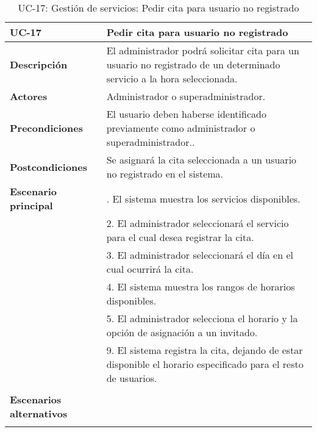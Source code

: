 \begin{table}[H]
  \begin{center}
    \begin{tabularx}{16.4cm}{|l|X|}
      \hline
      \textbf{UC-17} & \textbf{Pedir cita para usuario no registrado}\\
      \hline
      \textbf{Descripción} & El administrador podrá solicitar cita para un usuario no registrado de un determinado servicio a la hora seleccionada.\\
      \hline
      \textbf{Actores} & Administrador o superadministrador.\\
      \hline
      \textbf{Precondiciones} & El usuario deben haberse identificado previamente como administrador o superadministrador..\\
      \hline
      \textbf{Postcondiciones} & Se asignará la cita seleccionada a un usuario no registrado en el sistema.\\
      \hline
      \textbf{Escenario principal} & \smallskip 1. El sistema muestra los servicios disponibles.\\
      & 2. El administrador seleccionará el servicio para el cual desea registrar la cita.\\
      & 3. El administrador seleccionará el día en el cual ocurrirá la cita.\\
      & 4. El sistema muestra los rangos de horarios disponibles.\\
      & 5. El administrador selecciona el horario y la opción de asignación a un invitado.\\
      & 9. El sistema registra la cita, dejando de estar disponible el horario especificado para el resto de usuarios.\\
      & \\
      \hline
      \textbf{Escenarios alternativos} & \\
      & \\
      \hline
    \end{tabularx}
    \caption{UC-17: Gestión de servicios: Pedir cita para usuario no registrado}
  \end{center}
\end{table}


